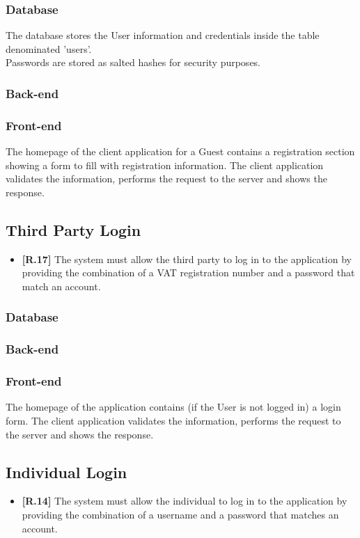 \subsubsection*{Database}
The database stores the User information and credentials inside the table denominated 'users'.\\
Passwords are stored as salted hashes for security purposes.

\subsubsection*{Back-end} 

\subsubsection*{Front-end}
The homepage of the client application for a Guest contains a registration section showing a form to fill with registration information. The client application validates the information, performs the request to the server and shows the response.


\subsection{Third Party Login}
\begin{itemize}
	\item {\color{ProcessBlue}\textbf{[R.17]}} The system must allow the third party to log in to the application by providing the combination of a VAT registration number and a password that match an account.
\end{itemize}
\subsubsection*{Database}


\subsubsection*{Back-end}


\subsubsection*{Front-end}
The homepage of the application contains (if the User is not logged in) a login form. The client application validates the information, performs the request to the server and shows the response.

\subsection{Individual Login}
\begin{itemize}
	\item {\color{ProcessBlue}\textbf{[R.14]}} The system must allow the individual to log in to the application by providing the combination of a username and a password that matches an account.
\end{itemize}
